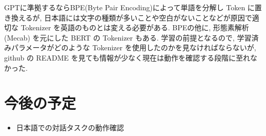 \documentclass[twocolumn]{jarticle}     %
\begin{document}
GPTに準拠するならBPE(Byte Pair Encoding)によって単語を分解し Token に置き換えるが,
日本語には文字の種類が多いことや空白がないことなどが原因で適切な Tokenizer を英語のものとは変える必要がある.
BPEの他に, 形態素解析 (Mecab) を元にした BERT の Tokenizer もある.
学習の前提となるので, 学習済みパラメータがどのような Tokenizer を使用したのかを見なければならないが, github の README を見ても情報が少なく現在は動作を確認する段階に至れなかった.



\section{今後の予定}
\begin{itemize}
  \item 日本語での対話タスクの動作確認
\end{itemize}



\end{document}
